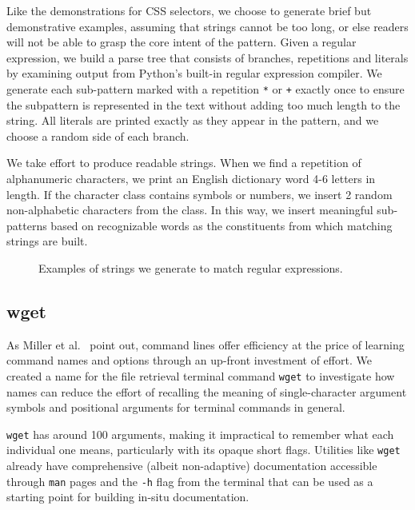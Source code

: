Like the demonstrations for CSS selectors, we choose to generate brief but demonstrative examples, assuming that strings cannot be too long, or else readers will not be able to grasp the core intent of the pattern.
Given a regular expression, we build a parse tree that consists of branches, repetitions and literals by examining output from Python's built-in regular expression compiler.
We generate each sub-pattern marked with a repetition \texttt{*} or \texttt{+} exactly once to ensure the subpattern is represented in the text without adding too much length to the string.
All literals are printed exactly as they appear in the pattern, and we choose a random side of each branch. 

We take effort to produce readable strings.
When we find a repetition of alphanumeric characters, we print an English dictionary word 4-6 letters in length.
If the character class contains symbols or numbers, we insert 2 random non-alphabetic characters from the class.
In this way, we insert meaningful sub-patterns based on recognizable words as the constituents from which matching strings are built.
\fi

\begin{figure}
\centering
\setlength{\fboxsep}{10pt}
\noindent{}
\caption{Examples of strings we generate to match regular expressions.}
\label{fig:regex_strings}
\end{figure}

\subsection{wget}

\begin{changes}
As Miller et al.~\cite{miller_inky_2008} point out, command lines offer efficiency at the price of learning command names and options through an up-front investment of effort.
We created a \gls{name} for the file retrieval terminal command \texttt{wget} to investigate how \glspl{name} can reduce the effort of recalling the meaning of single-character argument symbols and positional arguments for terminal commands in general.
\end{changes}
\texttt{wget} has around 100 arguments, making it impractical to remember what each individual one means, particularly with its opaque short flags.
Utilities like \texttt{wget} already have comprehensive (albeit non-adaptive) documentation accessible through \texttt{man} pages and the \texttt{-h} flag from the terminal that can be used as a starting point for building in-situ documentation.

